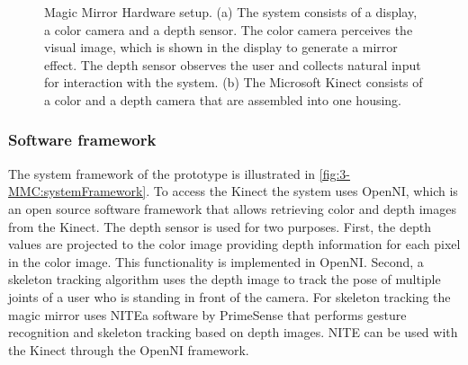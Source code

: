 \begin{figure}
	\centering
	\caption[Magic Mirror Hardware setup]{Magic Mirror Hardware setup. (a) The system consists of a display, a color camera and a depth sensor. The color camera perceives the visual image, which is shown in the display to generate a mirror effect. The depth sensor observes the user and collects natural input for interaction with the system. (b) The Microsoft Kinect consists of a color and a depth camera that are assembled into one housing.}
	\label{fig:3-MMC:hardware}
\end{figure}

\subsubsection{Software framework}
The system framework of the prototype is illustrated in \figurename{ \ref{fig:3-MMC:systemFramework}}.
To access the Kinect the system uses OpenNI\footnotemark, which is an open source software framework that allows retrieving color and depth images from the Kinect. The depth sensor is used for two purposes. First, the depth values are projected to the color image providing depth information for each pixel in the color image. This functionality is implemented in OpenNI. Second, a skeleton tracking algorithm uses the depth image to track the pose of multiple joints of a user who is standing in front of the camera. For skeleton tracking the magic mirror uses NITE\footnotemark[\value{footnote}] a software by PrimeSense that performs gesture recognition and skeleton tracking based on depth images. NITE can be used with the Kinect through the OpenNI framework. 


